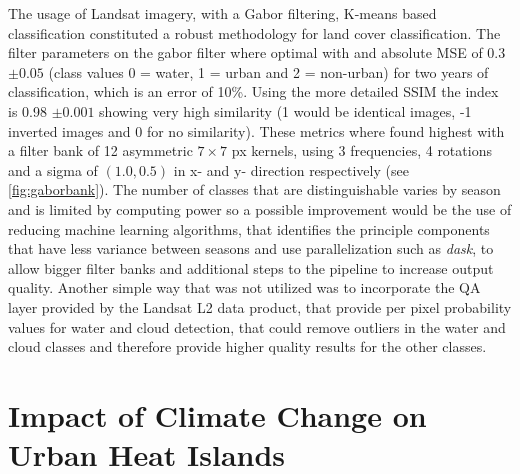 \documentclass[12pt,a4paper, english,twoside]{scrartcl}
\begin{document}
    The usage of Landsat imagery, with a Gabor filtering, K-means based classification constituted a robust methodology for land cover classification.
    The filter parameters on the gabor filter where optimal with and absolute MSE of 0.3 $\pm 0.05$ (class values 0 = water, 1 = urban and 2 = non-urban) for two years of classification, which is an error of 10\%.
    Using the more detailed \gls{SSIM} the index is 0.98 $\pm 0.001$ showing very high similarity (1 would be identical images, -1 inverted images and 0 for no similarity). 
    These metrics where found highest with a filter bank of 12 asymmetric $7\times7$ px kernels, using 3 frequencies, 4 rotations and a sigma of $(1.0,0.5)$ in x- and y- direction respectively (see \cref{fig:gaborbank}).
    \todo[inline,size=\tiny]{}
    The number of classes that are distinguishable varies by season and is limited by computing power so a possible improvement would be the use of reducing machine learning algorithms, that identifies the principle components that have less variance between seasons and use parallelization such as \textit{dask}\autocite{dask}, to allow bigger filter banks and additional steps to the pipeline to increase output quality.
    Another simple way that was not utilized was to incorporate the QA layer provided by the Landsat L2 data product, that provide per pixel probability values for water and cloud detection, that could remove outliers in the water and cloud classes and therefore provide higher quality results for the other classes. 
    
  \newpage
  \section{Impact of Climate Change on Urban Heat Islands}\label{sec:UHITempImp}
\end{document}
